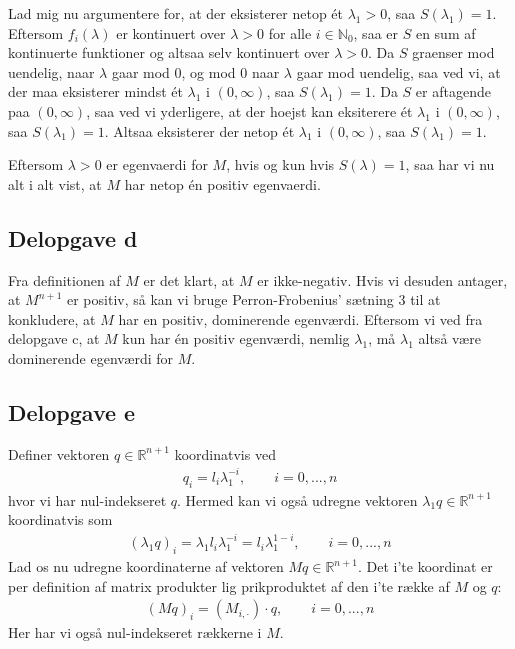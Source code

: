 \documentclass[12pt]{article}
\begin{document}
Lad mig nu argumentere for, at der eksisterer netop ét $\lambda_1 >0$, saa $S(\lambda_1)=1$. Eftersom $f_i(\lambda)$ er kontinuert over $\lambda > 0$ for alle $i\in \mathbb{N}_0$, saa er $S$ en sum af kontinuerte funktioner og altsaa selv kontinuert over $\lambda >0$. Da $S$ graenser mod uendelig, naar $\lambda$ gaar mod 0, og mod 0 naar $\lambda$ gaar mod uendelig, saa ved vi, at der maa eksisterer mindst ét $\lambda_1$ i $(0, \infty)$, saa $S(\lambda_1)=1$. Da $S$ er aftagende paa $(0, \infty)$, saa ved vi yderligere, at der hoejst kan eksiterere ét $\lambda_1$ i $(0, \infty)$, saa $S(\lambda_1) =1$. Altsaa eksisterer der netop ét $\lambda_1$ i $(0, \infty)$, saa $S(\lambda_1) =1$.

Eftersom $\lambda>0$ er egenvaerdi for $M$, hvis og kun hvis $S(\lambda)=1$, saa har vi nu alt i alt vist, at $M$ har netop én positiv egenvaerdi.

\subsection{Delopgave d}

Fra definitionen af $M$ er det klart, at $M$ er ikke-negativ. Hvis vi desuden antager, at $M^{n+1}$ er positiv, så kan vi bruge Perron-Frobenius' sætning 3 til at konkludere, at $M$ har en positiv, dominerende egenværdi. Eftersom vi ved fra delopgave c, at $M$ kun har én positiv egenværdi, nemlig $\lambda_1$, må $\lambda_1$ altså være dominerende egenværdi for $M$.

\subsection{Delopgave e}

Definer vektoren $q\in \mathbb{R}^{n+1}$ koordinatvis ved
\begin{align}
q_i = l_{i}\lambda_1^{-i}, \qquad i=0,...,n
\end{align}
hvor vi har nul-indekseret $q$. Hermed kan vi også udregne vektoren $\lambda_1q\in \mathbb{R}^{n+1}$ koordinatvis som 
\begin{align}
(\lambda_1 q)_i = \lambda_1l_{i}\lambda_1^{-i} = l_{i}\lambda_1^{1-i}, \qquad i=0,...,n
\end{align}
Lad os nu udregne koordinaterne af vektoren $Mq\in \mathbb{R}^{n+1}$. Det i'te koordinat er per definition af matrix produkter lig prikproduktet af den i'te række af $M$ og $q$:
\begin{align}
(Mq)_i = (M_{i,\cdot})\cdot q, \qquad i=0,...,n
\end{align}
Her har vi også nul-indekseret rækkerne i $M$. 
\end{document}
